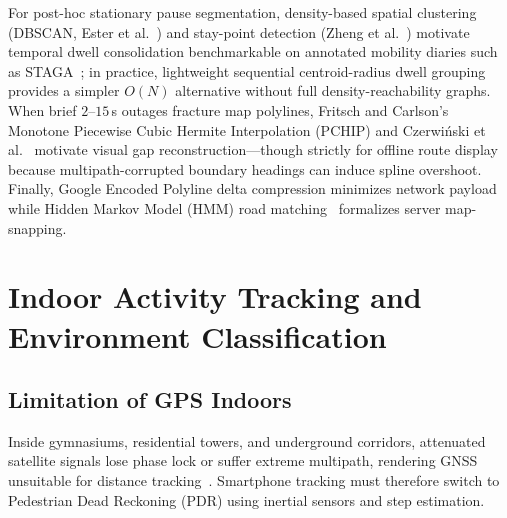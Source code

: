 For post-hoc stationary pause segmentation, density-based spatial clustering (DBSCAN, Ester et al.~\cite{ester1996dbscan}) and stay-point detection (Zheng et al.~\cite{zheng2009mining}) motivate temporal dwell consolidation benchmarkable on annotated mobility diaries such as STAGA~\cite{spang2022staga}; in practice, lightweight sequential centroid-radius dwell grouping provides a simpler $O(N)$ alternative without full density-reachability graphs. When brief $2$--$15$\,s outages fracture map polylines, Fritsch and Carlson's~\cite{fritsch1980pchip} Monotone Piecewise Cubic Hermite Interpolation (PCHIP) and Czerwi{\'n}ski et al.~\cite{czerwinski2026reconstruction} motivate visual gap reconstruction---though strictly for offline route display because multipath-corrupted boundary headings can induce spline overshoot. Finally, Google Encoded Polyline delta compression minimizes network payload while Hidden Markov Model (HMM) road matching~\cite{newson2009hidden} formalizes server map-snapping.

\section{Indoor Activity Tracking and Environment Classification}
\label{sec:indoor_and_iod}

\subsection{Limitation of GPS Indoors}
Inside gymnasiums, residential towers, and underground corridors, attenuated satellite signals lose phase lock or suffer extreme multipath, rendering GNSS unsuitable for distance tracking~\cite{harle2013survey}. Smartphone tracking must therefore switch to Pedestrian Dead Reckoning (PDR) using inertial sensors and step estimation.

